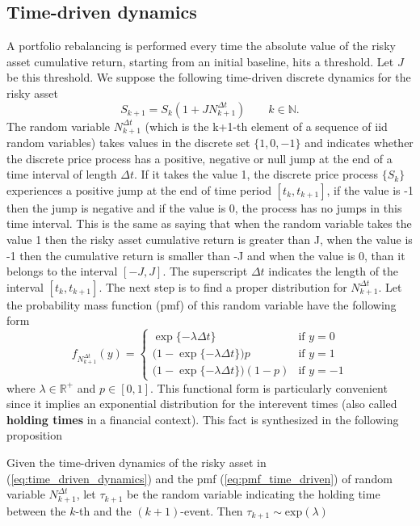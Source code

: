 \subsection{Time-driven dynamics}
A portfolio rebalancing is performed every time the absolute value of the risky asset cumulative return, starting from an initial baseline, hits a threshold. Let $J$ be this threshold. We suppose the following time-driven discrete dynamics for the risky asset
\begin{equation}\label{eq:time_driven_dynamics}
S_{k+1} = S_k(1 + J N^{\Delta t}_{k+1}) \qquad k \in \mathbb{N}.
\end{equation}
The random variable $N^{\Delta t}_{k+1}$ (which is the k+1-th element of a sequence of iid random variables) takes values in the discrete set $\{1,0,-1\}$ and indicates whether the discrete price process has a positive, negative or null jump at the end of a time interval of length $\Delta t$. If it takes the value 1, the discrete price process $\{S_k\}$ experiences a positive jump at the end of time period $[t_k,t_{k+1}]$, if the value is -1 then the jump is negative and if the value is 0, the process has no jumps in this time interval. This is the same as saying that when the random variable takes the value 1 then the risky asset cumulative return is greater than J, when the value is -1 then the cumulative return is smaller than -J and when the value is 0, than it belongs to the interval $[-J,J]$. The superscript $\Delta t$ indicates the length of the interval $[t_k,t_{k+1}]$. The next step is to find a proper distribution for $N^{\Delta t}_{k+1}$.
Let the probability mass function (pmf) of this random variable  have the following form
\begin{equation}\label{eq:pmf_time_driven}
f_{N^{\Delta t}_{k+1}}(y) = 
\begin{cases}
 \exp\{-\lambda \Delta t\} & \text{if } y = 0 \\
 \big(1-\exp\{-\lambda \Delta t\}\big)p & \text{if } y = 1 \\
 \big(1-\exp\{-\lambda \Delta t\}\big)(1-p) & \text{if } y = -1
\end{cases}
\end{equation}
where $\lambda \in \mathbb{R}^{+}$ and $p \in [0,1]$. This functional form is particularly convenient since it implies an exponential distribution for the interevent times (also called \textbf{holding times} in a financial context). This fact is synthesized in the following proposition
\begin{proposition}\label{prop:tau_distribution}
	Given the time-driven dynamics of the risky asset in (\ref{eq:time_driven_dynamics}) and the pmf (\ref{eq:pmf_time_driven}) of random variable $N^{\Delta t}_{k+1}$, let $\tau_{k+1}$ be the random variable indicating the holding time between the $k$-th and the $(k+1)$-event.
	Then $\tau_{k+1} \sim \text{exp}(\lambda)$
\end{proposition}
